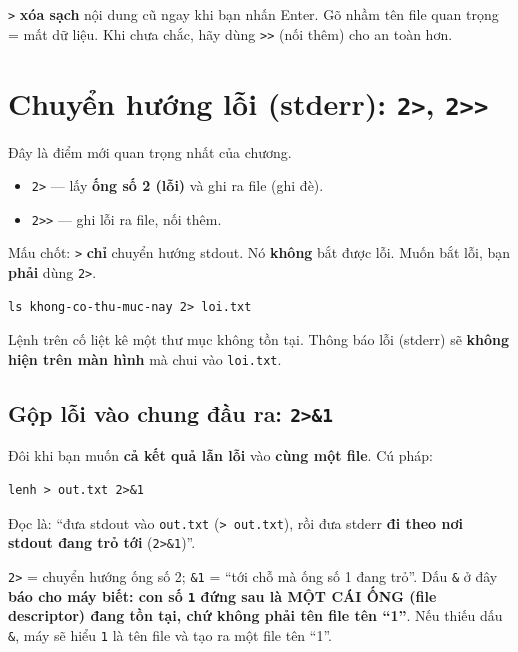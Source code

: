 \documentclass[12pt,a4paper]{article}
\newcommand{\cmd}[1]{\texttt{#1}}
\begin{document}
\begin{dangerbox}[title={Cạm bẫy}]
\cmd{>} \textbf{xóa sạch} nội dung cũ ngay khi bạn nhấn Enter. Gõ nhầm tên file quan trọng = mất dữ liệu. Khi chưa chắc, hãy dùng \cmd{>>} (nối thêm) cho an toàn hơn.
\end{dangerbox}

\section{Chuyển hướng lỗi (stderr): \texttt{2>}, \texttt{2>>}}

Đây là điểm mới quan trọng nhất của chương.

\begin{itemize}[leftmargin=1.4em]
\item \cmd{2>} --- lấy \textbf{ống số 2 (lỗi)} và ghi ra file (ghi đè).
\item \cmd{2>>} --- ghi lỗi ra file, nối thêm.
\end{itemize}

Mấu chốt: \cmd{>} \textbf{chỉ} chuyển hướng stdout. Nó \textbf{không} bắt được lỗi. Muốn bắt lỗi, bạn \textbf{phải} dùng \cmd{2>}.

\begin{Verbatim}
ls khong-co-thu-muc-nay 2> loi.txt
\end{Verbatim}

Lệnh trên cố liệt kê một thư mục không tồn tại. Thông báo lỗi (stderr) sẽ \textbf{không hiện trên màn hình} mà chui vào \cmd{loi.txt}.

\subsection{Gộp lỗi vào chung đầu ra: \texttt{2>\&1}}

Đôi khi bạn muốn \textbf{cả kết quả lẫn lỗi} vào \textbf{cùng một file}. Cú pháp:

\begin{Verbatim}
lenh > out.txt 2>&1
\end{Verbatim}

Đọc là: ``đưa stdout vào \cmd{out.txt} (\cmd{> out.txt}), rồi đưa stderr \textbf{đi theo nơi stdout đang trỏ tới} (\cmd{2>\&1})''.

\begin{notebox}[title={Giải mã \texttt{2>\&1}}]
\cmd{2>} = chuyển hướng ống số 2; \cmd{\&1} = ``tới chỗ mà ống số 1 đang trỏ''. Dấu \cmd{\&} ở đây \textbf{báo cho máy biết: con số \cmd{1} đứng sau là MỘT CÁI ỐNG (file descriptor) đang tồn tại, chứ không phải tên file tên ``1''}. Nếu thiếu dấu \cmd{\&}, máy sẽ hiểu \cmd{1} là tên file và tạo ra một file tên ``1''.
\end{notebox}
\end{document}
